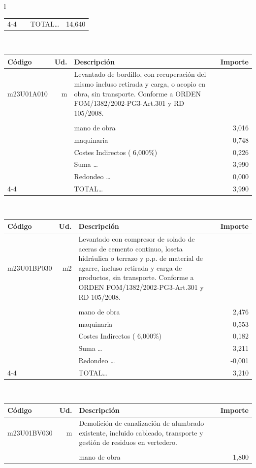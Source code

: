 \documentclass{book}%
\begin{document}
\begin{longtable}{l}
\begin{tabular}{l r p{60mm} r}
\cline{4-4}%
&&TOTAL\ldots&    14,640\\%
\end{tabular}\\%
\begin{tabular}{l r p{60mm} r}%
Código&Ud.&Descripción&Importe\\%
\hline%
m23U01A010&m&Levantado de bordillo, con recuperación del mismo incluso retirada y carga, o acopio en obra, sin transporte. Conforme a ORDEN FOM/1382/2002{-}PG3{-}Art.301 y RD 105/2008.&\\%
&&&\\%
&&mano de obra&     3,016\\%
&&maquinaria&     0,748\\%
&&Costes Indirectos (     6,000\%)&     0,226\\%
&&Suma \ldots&     3,990\\%
&&Redondeo \ldots&     0,000\\%
\cline{4-4}%
&&TOTAL\ldots&     3,990\\%
\end{tabular}\\%
\begin{tabular}{l r p{60mm} r}%
Código&Ud.&Descripción&Importe\\%
\hline%
m23U01BP030&m2&Levantado con compresor de solado de aceras de cemento continuo, loseta hidráulica o terrazo y p.p. de material de agarre, incluso retirada y carga de productos, sin transporte. Conforme a ORDEN FOM/1382/2002{-}PG3{-}Art.301 y RD 105/2008.&\\%
&&&\\%
&&mano de obra&     2,476\\%
&&maquinaria&     0,553\\%
&&Costes Indirectos (     6,000\%)&     0,182\\%
&&Suma \ldots&     3,211\\%
&&Redondeo \ldots&    {-}0,001\\%
\cline{4-4}%
&&TOTAL\ldots&     3,210\\%
\end{tabular}\\%
\begin{tabular}{l r p{60mm} r}%
Código&Ud.&Descripción&Importe\\%
\hline%
m23U01BV030&m&Demolición de canalización de alumbrado existente, incluido cableado, transporte y gestión de residuos en vertedero.&\\%
&&&\\%
&&mano de obra&     1,800\\%

\end{tabular}
\end{longtable}
\end{document}

